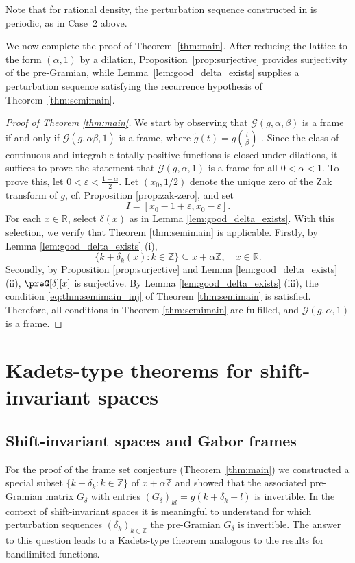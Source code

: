 \documentclass[reqno,a4paper,12pt]{amsart}
\numberwithin{equation}{section}
\def\Z{{\mathbb Z}}
\def\R{{\mathbb R}}
\newcommand\1{\mathds{1}}
\newcommand{\cG}{\mathcal{G}}
\begin{document}
Note that for rational density, the perturbation sequence constructed in
\cite{Groechenig2023} is periodic, as in Case~2 above.

We now complete the proof of Theorem~\ref{thm:main}. After reducing the lattice
to the form $(\alpha,1)$ by a dilation, Proposition~\ref{prop:surjective}
provides surjectivity of the pre-Gramian, while
Lemma~\ref{lem:good_delta_exists} supplies a perturbation sequence satisfying
the recurrence hypothesis of Theorem~\ref{thm:semimain}.

\begin{proof}[Proof of Theorem \ref{thm:main}]
We start by observing that $\cG(g,\alpha,\beta)$ is a frame if and only if $\cG(\tilde{g},\alpha \beta,1)$  is a frame, where $\tilde{g}(t)=g(\tfrac{t}{\beta})$ \cite[Prop.~9.4.4., or p.~200]{Groechenig2001}. 
Since the class of continuous and integrable totally positive functions is closed under dilations, it suffices to prove the statement that $\cG(g,\alpha,1)$ is a frame for all  $0<\alpha<1$.
To prove this, let $0<\varepsilon<\tfrac{1-\alpha}{2}$.
Let $(x_0,1/2)$ denote the unique zero of the Zak transform of $g$, cf. Proposition \ref{prop:zak-zero},
and set
\begin{equation}
    I = [x_0-1+\varepsilon, x_0-\varepsilon].
\end{equation}
For each $x\in\R$, select $\delta(x)$ as in Lemma \ref{lem:good_delta_exists}. With this selection, we verify that Theorem \ref{thm:semimain} is applicable.
Firstly, by Lemma \ref{lem:good_delta_exists} \textup{(i)},
\begin{equation}
    \{k+\delta_k(x):k\in\Z\}\subseteq x+\alpha\Z,\quad x\in\R.
\end{equation}
Secondly, by Proposition \ref{prop:surjective} and Lemma \ref{lem:good_delta_exists} \textup{(ii)}, $\preG[\delta][x]$ is surjective. 
By Lemma \ref{lem:good_delta_exists} \textup{(iii)}, the condition \eqref{eq:thm:semimain_inj} of Theorem \ref{thm:semimain} is satisfied. Therefore, all conditions in Theorem \ref{thm:semimain} are fulfilled, and $\cG(g,\alpha,1)$ is a frame.
\end{proof}

\section{Kadets-type theorems for shift-invariant spaces}
\subsection{Shift-invariant spaces and Gabor frames} \label{sec:52}
For the proof of the frame set conjecture (Theorem~\ref{thm:main}) we
constructed a special subset $\{k+\delta _k : k\in \Z \}$ of $x+\alpha
\Z $ and showed that the associated pre-Gramian matrix $G_\delta $
with entries $(G_\delta )_{kl} = g(k+\delta _k -l)$ is invertible. In
the context of shift-invariant spaces it is meaningful to understand
for  which perturbation sequences $(\delta _k)_{k\in \Z }$ the
pre-Gramian $G_\delta $ is invertible. The answer to this question
leads to a Kadets-type theorem analogous to the results for
bandlimited functions.
\end{document}
